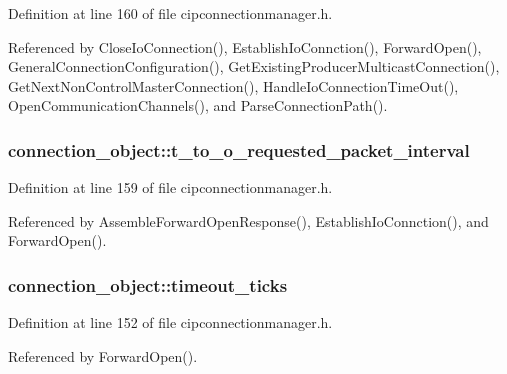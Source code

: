 \-Definition at line 160 of file cipconnectionmanager.\-h.



\-Referenced by \-Close\-Io\-Connection(), \-Establish\-Io\-Connction(), \-Forward\-Open(), \-General\-Connection\-Configuration(), \-Get\-Existing\-Producer\-Multicast\-Connection(), \-Get\-Next\-Non\-Control\-Master\-Connection(), \-Handle\-Io\-Connection\-Time\-Out(), \-Open\-Communication\-Channels(), and \-Parse\-Connection\-Path().

\hypertarget{structconnection__object_adab05e9bb9a28f649747d8df7371d735}{
\subsubsection[{t\-\_\-to\-\_\-o\-\_\-requested\-\_\-packet\-\_\-interval}]{ {\bf connection\-\_\-object\-::t\-\_\-to\-\_\-o\-\_\-requested\-\_\-packet\-\_\-interval}}}\label{d1/d48/structconnection__object_adab05e9bb9a28f649747d8df7371d735}


\-Definition at line 159 of file cipconnectionmanager.\-h.



\-Referenced by \-Assemble\-Forward\-Open\-Response(), \-Establish\-Io\-Connction(), and \-Forward\-Open().

\hypertarget{structconnection__object_a525118f58c4165d5abd9abc834096ab0}{
\subsubsection[{timeout\-\_\-ticks}]{ {\bf connection\-\_\-object\-::timeout\-\_\-ticks}}}\label{d1/d48/structconnection__object_a525118f58c4165d5abd9abc834096ab0}


\-Definition at line 152 of file cipconnectionmanager.\-h.



\-Referenced by \-Forward\-Open().

